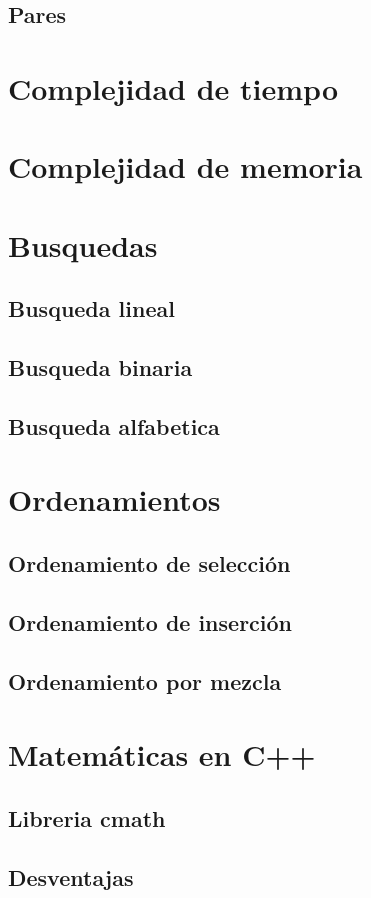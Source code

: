 \documentclass{article}
\begin{document}
\subsection{Pares}

\section{Complejidad de tiempo}

\section{Complejidad de memoria}

\section{Busquedas}

\subsection{Busqueda lineal}

\subsection{Busqueda binaria}

\subsection{Busqueda alfabetica}

\section{Ordenamientos}

\subsection{Ordenamiento de selección}

\subsection{Ordenamiento de inserción}

\subsection{Ordenamiento por mezcla}

\section{Matemáticas en C++}

\subsection{Libreria cmath}

\subsection{Desventajas}
\end{document}
